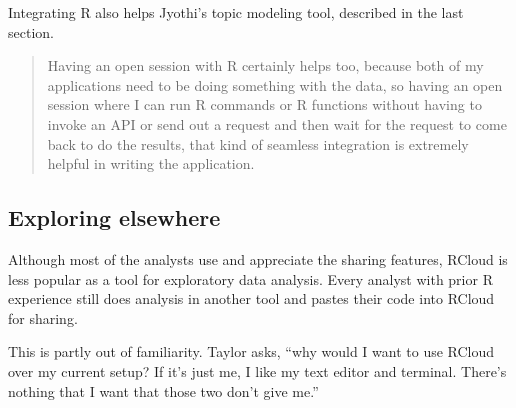 Integrating R also helps Jyothi's topic modeling tool, described in the last section.
\begin{quote}
Having an open session with R certainly helps too, because both of my
applications need to be doing something with the data, so having an open session
where I can run R commands or R functions without having to invoke an API or
send out a request and then wait for the request to come back to do the results,
that kind of seamless integration is extremely helpful in writing the
application.
\end{quote}




\subsection{Exploring elsewhere}

Although most of the analysts use and appreciate the sharing features,
RCloud is less popular as a tool for exploratory data analysis. Every
analyst with prior R experience still does analysis in another tool and
pastes their code into RCloud for sharing.

This is partly out of familiarity. Taylor asks, ``why would I want to use
RCloud over my current setup? If it's just me, I like my text editor and
terminal. There's nothing that I want that those two don't give me.''


